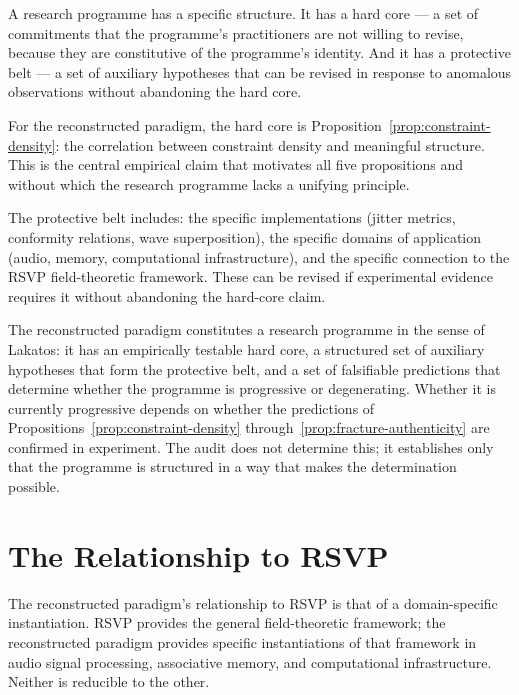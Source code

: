 A research programme has a specific structure. It has
a hard core --- a set of commitments that the programme's
practitioners are not willing to revise, because they
are constitutive of the programme's identity. And it
has a protective belt --- a set of auxiliary hypotheses
that can be revised in response to anomalous observations
without abandoning the hard core.

For the reconstructed paradigm, the hard core is
Proposition~\ref{prop:constraint-density}: the correlation
between constraint density and meaningful structure.
This is the central empirical claim that motivates all
five propositions and without which the research programme
lacks a unifying principle.

The protective belt includes: the specific implementations
(jitter metrics, conformity relations, wave superposition),
the specific domains of application (audio, memory,
computational infrastructure), and the specific
connection to the RSVP field-theoretic framework. These
can be revised if experimental evidence requires it
without abandoning the hard-core claim.

\begin{auditprop}
\label{ap:reconstructed-programme}
The reconstructed paradigm constitutes a research
programme in the sense of Lakatos: it has an empirically
testable hard core, a structured set of auxiliary
hypotheses that form the protective belt, and a set
of falsifiable predictions that determine whether the
programme is progressive or degenerating. Whether
it is currently progressive depends on whether the
predictions of Propositions~\ref{prop:constraint-density}
through~\ref{prop:fracture-authenticity} are confirmed
in experiment. The audit does not determine this; it
establishes only that the programme is structured in
a way that makes the determination possible.
\end{auditprop}

\section{The Relationship to RSVP}
\label{sec:relationship-rsvp}

The reconstructed paradigm's relationship to RSVP
is that of a domain-specific instantiation. RSVP
provides the general field-theoretic framework;
the reconstructed paradigm provides specific instantiations
of that framework in audio signal processing, associative
memory, and computational infrastructure. Neither
is reducible to the other.

